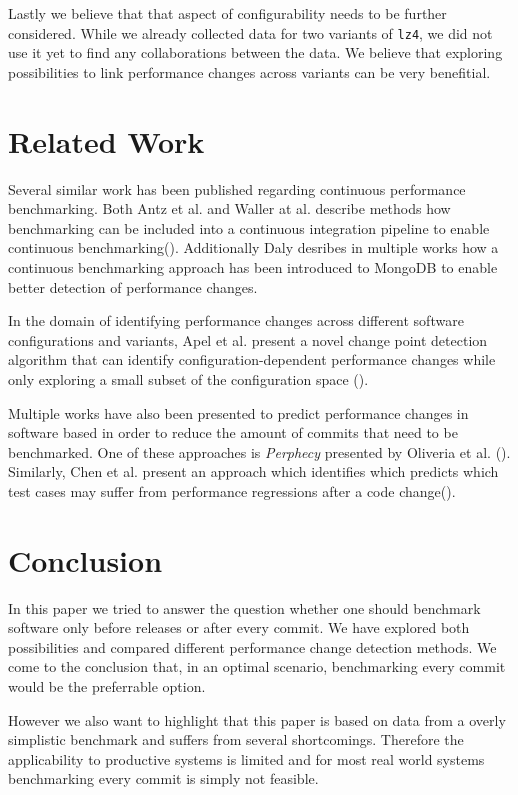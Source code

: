\documentclass[	runningheads,
				a4paper]{llncs}
\begin{document}
	Lastly we believe that that aspect of configurability needs to be further considered. While we already collected data for two variants of \texttt{lz4}, we did not use it yet to find any collaborations between the data. We believe that exploring possibilities to link performance changes across variants can be very benefitial.

\section{Related Work}

Several similar work has been published regarding continuous performance benchmarking. Both Antz et al. and Waller at al. describe methods how benchmarking can be included into a continuous integration pipeline to enable continuous benchmarking(\cite{}). Additionally Daly desribes in multiple works how a continuous benchmarking approach has been introduced to MongoDB to enable better detection of performance changes.

In the domain of identifying performance changes across different software configurations and variants, Apel et al. present a novel change point detection algorithm that can identify configuration-dependent performance changes while only exploring a small subset of the configuration space (\cite{}).

Multiple works have also been presented to predict performance changes in software based in order to reduce the amount of commits that need to be benchmarked. One of these approaches is \textit{Perphecy} presented by Oliveria et al. (\cite{}). Similarly, Chen et al. present an approach which identifies which predicts which test cases may suffer from performance regressions after a code change(\cite{}).

\section{Conclusion}

In this paper we tried to answer the question whether one should benchmark software only before releases or after every commit. We have explored both possibilities and compared different performance change detection methods. We come to the conclusion that, in an optimal scenario, benchmarking every commit would be the preferrable option.

However we also want to highlight that this paper is based on data from a overly simplistic benchmark and suffers from several shortcomings. Therefore the applicability to productive systems is limited and for most real world systems benchmarking every commit is simply not feasible.
\end{document}
